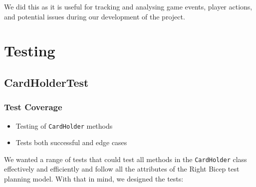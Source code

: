 \documentclass{article}
\begin{document}
    We did this as it is useful for tracking and analysing game events, player actions, and potential issues during our development of the project.


    \section{Testing}

    \subsection{CardHolderTest}

    \subsubsection{Test Coverage}
    \begin{itemize}
        \item Testing of \texttt{CardHolder} methods
        \item Tests both successful and edge cases
    \end{itemize}
    We wanted a range of tests that could test all methods in the \texttt{CardHolder} class effectively and efficiently and follow all the attributes of the Right Bicep test planning model. With that in mind, we designed the tests:
\end{document}
